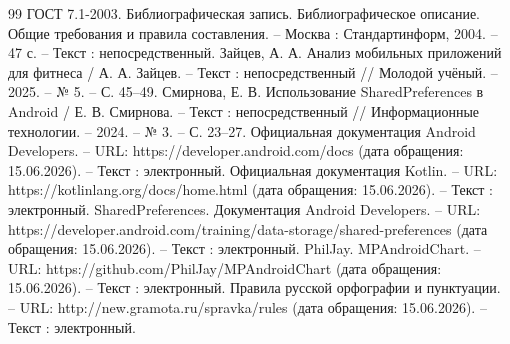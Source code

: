 \begin{thebibliography}{99}
	 ГОСТ 7.1-2003. Библиографическая запись. Библиографическое описание. Общие требования и правила составления. – Москва : Стандартинформ, 2004. – 47 с. – Текст : непосредственный.
	 Зайцев, А. А. Анализ мобильных приложений для фитнеса / А. А. Зайцев. – Текст : непосредственный // Молодой учёный. – 2025. – № 5. – С. 45–49.
	 Смирнова, Е. В. Использование SharedPreferences в Android / Е. В. Смирнова. – Текст : непосредственный // Информационные технологии. – 2024. – № 3. – С. 23–27.
	 Официальная документация Android Developers. – URL: https://developer.android.com/docs (дата обращения: 15.06.2026). – Текст : электронный.
	 Официальная документация Kotlin. – URL: https://kotlinlang.org/docs/home.html (дата обращения: 15.06.2026). – Текст : электронный.
	 SharedPreferences. Документация Android Developers. – URL: https://developer.android.com/training/data-storage/shared-preferences (дата обращения: 15.06.2026). – Текст : электронный.
	 PhilJay. MPAndroidChart. – URL: https://github.com/PhilJay/MPAndroidChart (дата обращения: 15.06.2026). – Текст : электронный.
	 Правила русской орфографии и пунктуации. – URL: http://new.gramota.ru/spravka/rules (дата обращения: 15.06.2026). – Текст : электронный.
\end{thebibliography}